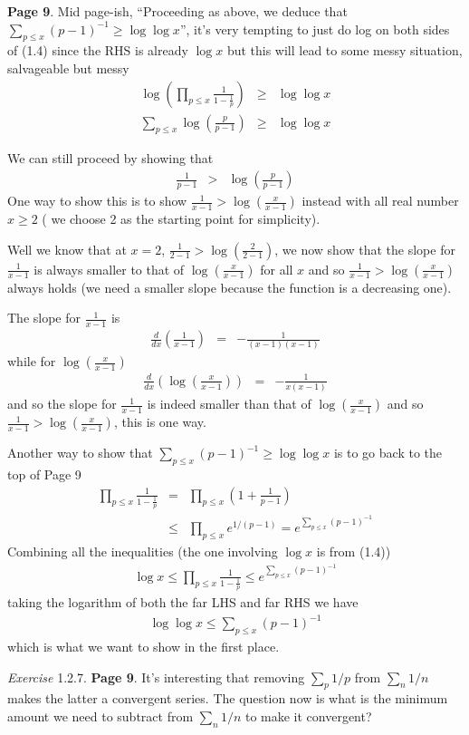\documentclass[aps,preprint,preprintnumbers,nofootinbib,showpacs,prd]{revtex4-1}
\newcommand{\nbea}{\begin{eqnarray*}}
\newcommand{\neea}{\end{eqnarray*}}
\begin{document}
{\bf Page 9}. Mid page-ish, ``Proceeding as above, we deduce that $\sum_{p\le x}(p-1)^{-1} \ge \log \log x$'', it's very tempting to just do log on both sides of (1.4) since the RHS is already $\log x$ but this will lead to some messy situation, salvageable but messy
%
\nbea
\log \left ( \prod_{p\le x} \frac{1}{1 - \frac{1}{p}} \right ) & \ge & \log \log x \\
\sum_{p\le x} \log \left (\frac{p}{p-1}\right ) & \ge & \log \log x
\neea
%

We can still proceed by showing that
%
\nbea
\frac{1}{p - 1} & > & \log \left (\frac{p}{p-1}\right )
\neea
%
One way to show this is to show $\frac{1}{x - 1} > \log \left (\frac{x}{x-1}\right )$ instead with all real number $x \ge 2$ ( we choose 2 as the starting point for simplicity).

Well we know that at $x = 2$, $\frac{1}{2 - 1} > \log \left (\frac{2}{2-1}\right )$, we now show that the slope for $\frac{1}{x - 1}$ is always smaller to that of $\log \left (\frac{x}{x-1}\right )$ for all $x$ and so $\frac{1}{x - 1} > \log \left (\frac{x}{x-1}\right )$ always holds (we need a smaller slope because the function is a decreasing one).

The slope for $\frac{1}{x - 1}$ is
%
\nbea
\frac{d}{dx}\left( \frac{1}{x - 1} \right ) & = & -\frac{1}{(x-1)(x-1)}
\neea
%
while for $\log \left (\frac{x}{x-1}\right )$
%
\nbea
\frac{d}{dx} \left (\log \left (\frac{x}{x-1}\right ) \right ) & = & -\frac{1}{x(x-1)}
\neea
%
and so the slope for $\frac{1}{x - 1}$ is indeed smaller than that of $\log \left (\frac{x}{x-1}\right )$ and so $\frac{1}{x - 1} > \log \left (\frac{x}{x-1}\right )$, this is one way.

Another way to show that $\sum_{p\le x}(p-1)^{-1} \ge \log \log x$ is to go back to the top of Page 9
%
\nbea
\prod_{p \le x} \frac{1}{1 - \frac{1}{p}} & = & \prod_{p \le x} \left ( 1 + \frac{1}{p - 1} \right ) \\
& \le & \prod_{p \le x} e^{1/(p-1)} = e^{\sum_{p\le x}(p-1)^{-1}}
\neea
%
Combining all the inequalities (the one involving $\log x$ is from (1.4))
%
\nbea
\log x \le \prod_{p \le x} \frac{1}{1 - \frac{1}{p}} \le e^{\sum_{p\le x}(p-1)^{-1}}
\neea
%
taking the logarithm of both the far LHS and far RHS we have
%
\nbea
\log \log x \le \sum_{p\le x}(p-1)^{-1}
\neea
%
which is what we want to show in the first place.

{\it Exercise} 1.2.7. {\bf Page 9}. It's interesting that removing $\sum_p 1/p$ from $\sum_n 1/n$ makes the latter a convergent series. The question now is what is the minimum amount we need to subtract from $\sum_n 1/n$ to make it convergent?
\end{document}

